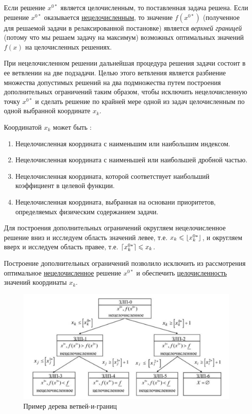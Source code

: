 \documentclass[%
	11pt,
	a4paper,
	utf8,
		]{article}
\begin{document}
Если решение $ x^{0*} $ является целочисленным, то поставленная задача решена. Если решение $ x^{0*} $ оказывается \underline{нецелочисленным}, то значение $ f(x^{0*}) $ (полученное для решаемой задачи в релаксированной постановке) является \emph{верхней границей} (потому что мы решаем задачу на максимум) возможных оптимальных значений $ f(x) $ на целочисленных решениях.

При нецелочисленном решении дальнейшая процедура решения задачи состоит в ее ветвлении на две подзадачи. Целью этого ветвления является разбиение множества допустимых решений на два подмножества путем построения дополнительных ограничений таким образом, чтобы исключить нецелочисленную точку $ x^{0*} $ и сделать решение по крайней мере одной из задач целочисленным по одной выбранной координате $ x_k $.

Координатой $ x_k $ может быть \cite[]{panteleev}:
\begin{enumerate}
	\item Нецелочисленная координата с наименьшим или наибольшим индексом.
	
	\item Нецелочисленная координата с наименьшей или наибольшей дробной частью.
	
	\item Нецелочисленная координата, которой соответствует наибольший коэффициент в целевой функции.
	
	\item Нецелочисленная координата, выбранная на основани приоритетов, определяемых физическим содержанием задачи.
\end{enumerate}

Для построения дополнительных ограничений округляем нецелочисленное решение вниз и исследуем область значений левее, т.е. $ x_k \leqslant \lfloor x_k^{0*}\rfloor $, и округляем вверх и исследуем область правее, т.е. $ \lceil x_k^{0*}\rceil \leqslant x_k $.

Построение дополнительных ограничений позволило исключить из рассмотрения оптимальное \underline{нецелочисленное} решение $ x^{0*} $ и обеспечить \underline{целочисленность} значений координаты $ x_k $.

\begin{figure}[h]
	\centering
	\includegraphics[scale=0.7]{figures/bb_tree.png}
	\caption{ Пример дерева ветвей-и-границ }\label{fig:bb_tree}
\end{figure}
\end{document}
